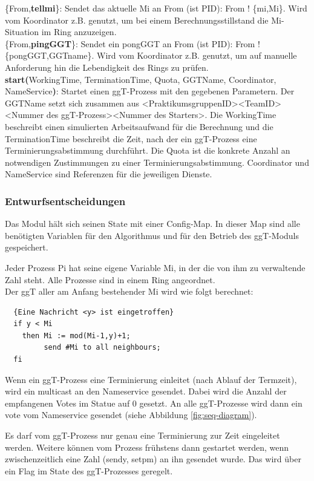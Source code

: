 \documentclass{article}
\begin{document}
\{From,\textbf{tellmi}\}: Sendet das aktuelle Mi an From (ist PID): From ! \{mi,Mi\}. Wird vom Koordinator z.B. genutzt,
um bei einem Berechnungsstillstand die Mi-Situation im Ring anzuzeigen.\\

\{From,\textbf{pingGGT}\}: Sendet ein pongGGT an From (ist PID): From ! \{pongGGT,GGTname\}. Wird vom Koordinator z.B.
genutzt, um auf manuelle Anforderung hin die Lebendigkeit des Rings zu prüfen.\\


\textbf{start(}WorkingTime, TerminationTime, Quota, GGTName, Coordinator, NameService\textbf{)}: Startet einen
ggT-Prozess mit den gegebenen Parametern. Der GGTName setzt sich zusammen aus <PraktikumsgruppenID><TeamID><Nummer des ggT-Prozess><Nummer des Starters>.
Die WorkingTime beschreibt einen simulierten Arbeitsaufwand für die Berechnung und die TerminationTime beschreibt die
Zeit, nach der ein ggT-Prozess eine Terminierungsabstimmung durchführt. Die Quota ist die konkrete Anzahl an
notwendigen Zustimmungen zu einer Terminierungsabstimmung. Coordinator und NameService sind Referenzen für die
jeweiligen Dienste.\\

\subsubsection{Entwurfsentscheidungen}
Das Modul hält sich seinen State mit einer Config-Map. In dieser Map sind alle benötigten Variablen für den Algorithmus
und für den Betrieb des ggT-Moduls gespeichert.

Jeder Prozess Pi hat seine eigene Variable Mi, in der die von ihm zu verwaltende Zahl steht.
Alle Prozesse sind in einem Ring angeordnet.\\

Der ggT aller am Anfang bestehender Mi wird wie folgt berechnet:
\begin{lstlisting}
  {Eine Nachricht <y> ist eingetroffen}
  if y < Mi
    then Mi := mod(Mi-1,y)+1;
         send #Mi to all neighbours;
  fi
\end{lstlisting}

Wenn ein ggT-Prozess eine Terminierung einleitet (nach Ablauf der Termzeit), wird ein multicast an den Nameservice
gesendet. Dabei wird die Anzahl der empfangenen Votes im Statue auf 0 gesetzt.
An alle ggT-Prozesse wird dann ein vote vom Nameservice gesendet (siehe Abbildung \ref{fig:seq-diagram}).

Es darf vom ggT-Prozess nur genau eine Terminierung zur Zeit eingeleitet werden. Weitere können vom Prozess frühstens
dann gestartet werden, wenn zwischenzeitlich eine Zahl (sendy, setpm) an ihn gesendet wurde. Das wird über ein Flag im
State des ggT-Prozesses geregelt.
\end{document}
